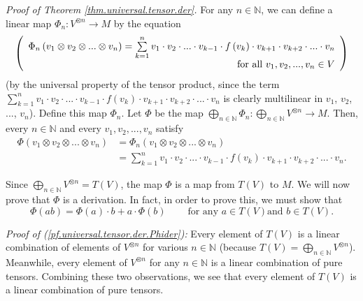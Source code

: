 \documentclass[etingof-lie.tex]{subfiles}
\begin{document}
\textit{Proof of Theorem \ref{thm.universal.tensor.der}.} For any
$n\in\mathbb{N}$, we can define a linear map $\Phi_{n}:V^{\otimes
n}\rightarrow M$ by the equation%
\begin{equation}
\left(
\begin{array}
[c]{r}%
\Phi_{n}\left(  v_{1}\otimes v_{2}\otimes...\otimes v_{n}\right)
=\sum\limits_{k=1}^{n}v_{1}\cdot v_{2}\cdot...\cdot v_{k-1}\cdot f\left(
v_{k}\right)  \cdot v_{k+1}\cdot v_{k+2}\cdot...\cdot v_{n}\\
\text{for all }v_{1},v_{2},...,v_{n}\in V
\end{array}
\right)  \label{pf.universal.tensor.der.Phin}%
\end{equation}
(by the universal property of the tensor product, since the term
$\sum\limits_{k=1}^{n}v_{1}\cdot v_{2}\cdot...\cdot v_{k-1}\cdot f\left(
v_{k}\right)  \cdot v_{k+1}\cdot v_{k+2}\cdot...\cdot v_{n}$ is clearly
multilinear in $v_{1}$, $v_{2}$, $...$, $v_{n}$). Define this map $\Phi_{n}$.
Let $\Phi$ be the map $\bigoplus\limits_{n\in\mathbb{N}}\Phi_{n}%
:\bigoplus\limits_{n\in\mathbb{N}}V^{\otimes n}\rightarrow M$. Then, every
$n\in\mathbb{N}$ and every $v_{1},v_{2},...,v_{n}$ satisfy%
\begin{align}
\Phi\left(  v_{1}\otimes v_{2}\otimes...\otimes v_{n}\right)   &  =\Phi
_{n}\left(  v_{1}\otimes v_{2}\otimes...\otimes v_{n}\right) \nonumber\\
&  =\sum\limits_{k=1}^{n}v_{1}\cdot v_{2}\cdot...\cdot v_{k-1}\cdot f\left(
v_{k}\right)  \cdot v_{k+1}\cdot v_{k+2}\cdot...\cdot v_{n}.
\label{pf.universal.tensor.der.Phi}%
\end{align}


Since $\bigoplus\limits_{n\in\mathbb{N}}V^{\otimes n}=T\left(  V\right)  $,
the map $\Phi$ is a map from $T\left(  V\right)  $ to $M$. We will now prove
that $\Phi$ is a derivation. In fact, in order to prove this, we must show
that%
\begin{equation}
\Phi\left(  ab\right)  =\Phi\left(  a\right)  \cdot b+a\cdot\Phi\left(
b\right)  \ \ \ \ \ \ \ \ \ \ \text{for any }a\in T\left(  V\right)  \text{
and }b\in T\left(  V\right)  . \label{pf.universal.tensor.der.Phider}%
\end{equation}


\textit{Proof of (\ref{pf.universal.tensor.der.Phider}):} Every element of
$T\left(  V\right)  $ is a linear combination of elements of $V^{\otimes n}$
for various $n\in\mathbb{N}$ (because $T\left(  V\right)  =\bigoplus
\limits_{n\in\mathbb{N}}V^{\otimes n}$). Meanwhile, every element of
$V^{\otimes n}$ for any $n\in\mathbb{N}$ is a linear combination of pure
tensors. Combining these two observations, we see that every element of
$T\left(  V\right)  $ is a linear combination of pure tensors.
\end{document}
